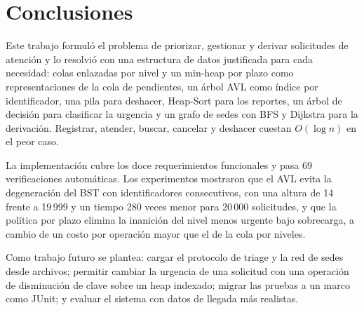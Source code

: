 \section{Conclusiones}
\label{sec:conclusiones}

Este trabajo formuló el problema de priorizar, gestionar y derivar
solicitudes de atención y lo resolvió con una estructura de datos
justificada para cada necesidad: colas enlazadas por nivel y un min-heap
por plazo como representaciones de la cola de pendientes, un árbol AVL como
índice por identificador, una pila para deshacer, Heap-Sort para los
reportes, un árbol de decisión para clasificar la urgencia y un grafo de
sedes con BFS y Dijkstra para la derivación. Registrar, atender, buscar,
cancelar y deshacer cuestan $O(\log n)$ en el peor caso.

La implementación cubre los doce requerimientos funcionales y pasa 69
verificaciones automáticas. Los experimentos mostraron que el AVL evita la
degeneración del BST con identificadores consecutivos, con una altura de 14
frente a 19\,999 y un tiempo 280 veces menor para 20\,000 solicitudes, y que
la política por plazo elimina la inanición del nivel menos urgente bajo
sobrecarga, a cambio de un costo por operación mayor que el de la cola por
niveles.

Como trabajo futuro se plantea: cargar el protocolo de triage y la red de
sedes desde archivos; permitir cambiar la urgencia de una solicitud con una
operación de disminución de clave sobre un heap indexado; migrar las
pruebas a un marco como JUnit; y evaluar el sistema con datos de llegada
más realistas.
